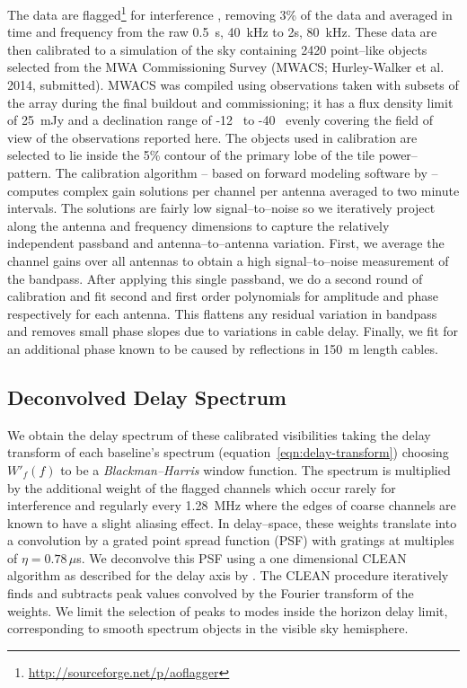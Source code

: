 \documentclass[preprint2,iop,numberedappendix]{emulateapj}
\begin{document}
The data are flagged\footnote{\url{http://sourceforge.net/p/aoflagger}} for interference \citep{off12,off10}, removing 3\% of the data and averaged in time  and frequency from the raw 0.5~s, 40~kHz to 2s, 80~kHz. These data are then calibrated to a simulation of the sky containing 2420 point--like objects selected from the MWA Commissioning Survey (MWACS; Hurley-Walker et al. 2014, submitted). MWACS was compiled using observations taken with subsets of the array during the final buildout and commissioning; it has a flux density limit of 25~mJy and a declination range of -12\arcdeg~ to -40\arcdeg~ evenly covering the field of view of the observations reported here. The objects used in calibration are selected to lie inside the 5\% contour of the primary lobe of the tile power--pattern. The calibration algorithm -- based on forward modeling software by \citet{sul12} -- computes complex gain solutions per channel per antenna averaged to two minute intervals. The solutions are fairly low signal--to--noise so we iteratively project along the antenna and frequency dimensions to capture the relatively independent passband and antenna--to--antenna variation. First, we average the channel gains over all antennas to obtain a high signal--to--noise measurement of the bandpass. After applying this single passband, we do a second round of calibration and fit second and first order polynomials for amplitude and phase respectively for each antenna. This flattens any residual variation in bandpass and removes small phase slopes due to variations in cable delay. Finally, we fit for an additional phase known to be caused by reflections in 150~m length cables. %

\subsection{Deconvolved Delay Spectrum}\label{sec:data-delay-spectrum}

We obtain the delay spectrum of these calibrated visibilities taking the delay transform of each baseline's spectrum (equation~\ref{eqn:delay-transform}) choosing $W'_f(f)$ to be a {\it Blackman--Harris} window function. The spectrum is multiplied by the additional weight of the flagged channels which occur rarely for interference and regularly every 1.28~MHz where the edges of coarse channels are known to have a slight aliasing effect. In delay--space, these weights translate into a convolution by a grated point spread function (PSF) with gratings at multiples of $\eta=0.78\,\mu$s. We deconvolve this PSF using a one dimensional CLEAN algorithm \citep{tay99} as described for the delay axis by \citet{par09,par12}. The CLEAN procedure iteratively finds and subtracts peak values convolved by the Fourier transform of the weights. We limit the selection of peaks to modes inside the horizon delay limit, corresponding to smooth spectrum objects in the visible sky hemisphere.
\end{document}

